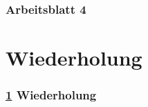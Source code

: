 \documentclass[9pt,german]{beamer}%
\begin{document}
\maketitle%
\addtocounter{framenumber}{-1}%

\begin{frame}
  \frametitle{Arbeitsblatt 4}%
\tableofcontents[hideallsubsections]
\end{frame}
\setcounter{exercise}{17}


\section{Wiederholung}\label{K:wdh}
\begin{frame}
  \frametitle{\ref{K:wdh} Wiederholung}%
\tableofcontents[current]
\end{frame}


\def\stitle{Rundungsfehler: Ausl\"oschung}
\end{document}
